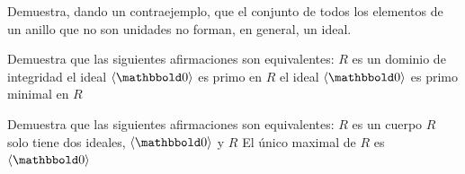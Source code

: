 \begin{problem}
Demuestra, dando un contraejemplo, que el conjunto de todos los elementos de un anillo que no son unidades no forman, en general, un ideal.
\solution
\end{problem}

\begin{problem}
Demuestra que las siguientes afirmaciones son equivalentes:
\ppart $R$ es un dominio de integridad
\ppart el ideal $\zerogen$ es primo en $R$
\ppart el ideal $\zerogen$ es primo minimal en $R$
\solution
\end{problem}

\begin{problem}
Demuestra que las siguientes afirmaciones son equivalentes:
\ppart $R$ es un cuerpo
\ppart $R$ solo tiene dos ideales, $\zerogen$ y $R$
\ppart El único maximal de $R$ es $\zerogen$
\solution
\end{problem}

